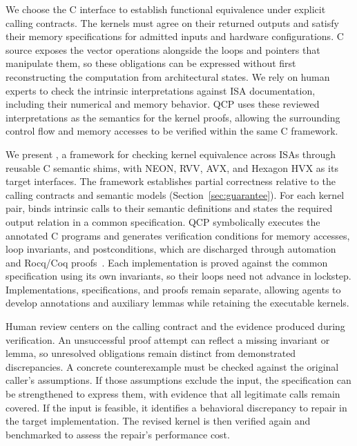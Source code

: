 We choose the C interface to establish functional equivalence under explicit calling contracts. The kernels must agree on their returned outputs and satisfy their memory specifications for admitted inputs and hardware configurations. C source exposes the vector operations alongside the loops and pointers that manipulate them, so these obligations can be expressed without first reconstructing the computation from architectural states. We rely on human experts to check the intrinsic interpretations against ISA documentation, including their numerical and memory behavior. QCP uses these reviewed interpretations as the semantics for the kernel proofs, allowing the surrounding control flow and memory accesses to be verified within the same C framework.

We present \tool, a framework for checking kernel equivalence across ISAs through reusable C semantic shims, with NEON, RVV, AVX, and Hexagon HVX as its target interfaces.  The framework establishes partial correctness relative to the calling contracts and semantic models (Section~\ref{sec:guarantee}). For each kernel pair, \tool binds intrinsic calls to their semantic definitions and states the required output relation in a common specification. QCP symbolically executes the annotated C programs and generates verification conditions for memory accesses, loop invariants, and postconditions, which are discharged through automation and Rocq/Coq proofs~\cite{qcp}. Each implementation is proved against the common specification using its own invariants, so their loops need not advance in lockstep. Implementations, specifications, and proofs remain separate, allowing agents to develop annotations and auxiliary lemmas while retaining the executable kernels.

Human review centers on the calling contract and the evidence produced during verification. An unsuccessful proof attempt can reflect a missing invariant or lemma, so unresolved obligations remain distinct from demonstrated discrepancies. A concrete counterexample must be checked against the original caller's assumptions. If those assumptions exclude the input, the specification can be strengthened to express them, with evidence that all legitimate calls remain covered. If the input is feasible, it identifies a behavioral discrepancy to repair in the target implementation. The revised kernel is then verified again and benchmarked to assess the repair's performance cost.


